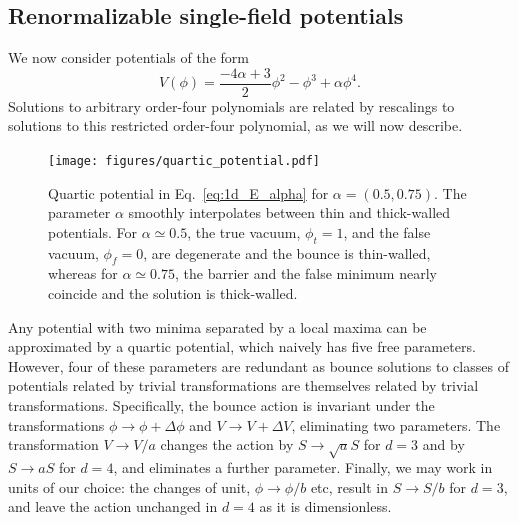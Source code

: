 \documentclass[final,3p,11pt,pdflatex]{elsarticle}
\renewcommand{\refeq}[1]{Eq.~\ref{#1}}
\newcommand{\fv}{\ensuremath{\phi_f}}
\newcommand{\tv}{\ensuremath{\phi_t}}
\begin{document}
\subsection{Renormalizable single-field potentials}\label{sec:reparam}

We now consider potentials of the form
\begin{equation}\label{eq:1d_E_alpha}
V(\phi) = \frac{-4 \alpha +3}{2} \phi^2-  \phi ^3 + \alpha \phi ^4.
\end{equation}
Solutions to arbitrary order-four polynomials are related by rescalings to
solutions to this restricted order-four polynomial, as we will now describe.


\begin{figure}
    \centering
      \texttt{[image: figures/quartic\_potential.pdf]}
    \caption{ Quartic potential in
      \refeq{eq:1d_E_alpha} for $\alpha = (0.5, 0.75)$.  The parameter
      $\alpha$ smoothly interpolates between thin and thick-walled
      potentials.  For $\alpha \simeq 0.5$, the true vacuum, $\tv =
      1$, and the false vacuum, $\fv = 0$, are degenerate and the
      bounce is thin-walled, whereas for $\alpha \simeq 0.75$, the
      barrier and the false minimum nearly coincide and the solution
      is thick-walled.}
    \label{fig:quartic_potential}
\end{figure}

Any potential with two minima separated by a local maxima can be approximated by a quartic potential, which naively has five free parameters. However, four of these parameters are redundant as bounce solutions to classes of potentials related by trivial transformations are themselves related by trivial transformations. Specifically, the bounce action is invariant under the transformations $\phi \to \phi + \Delta\phi$ and $V \to V + \Delta V$, eliminating two parameters. The transformation $V \to V / a$ changes the action by $S \to \sqrt{a} S$ for $d=3$ and by $S \to a S$ for $d=4$, and eliminates a further parameter. Finally, we may work in units of our choice: the changes of unit, $\phi \to \phi / b$ etc, result in $S \to S / b$ for $d=3$, and leave the action unchanged in $d=4$ as it is dimensionless.
\end{document}
